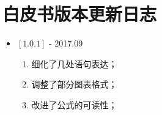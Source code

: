 \section{白皮书版本更新日志}
\begin{itemize}
\item $[1.0.1]$ - 2017.09
\begin{enumerate}
\item 细化了几处语句表达；
\item 调整了部分图表格式；
\item 改进了公式的可读性；
\end{enumerate}
\end{itemize}
